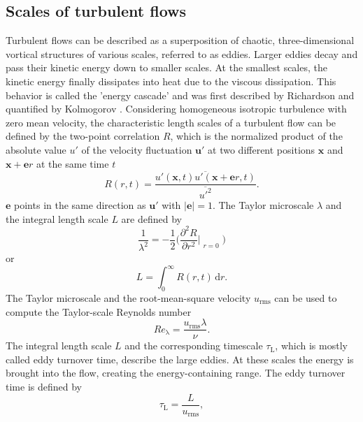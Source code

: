 \documentclass[11pt,a4paper,openany,oneside,parskip=half*]{article}
\renewcommand*\vec[1]{\boldsymbol{#1}}
\begin{document}
\subsection{Scales of turbulent flows}
Turbulent flows can be described as a superposition of chaotic, three-dimensional vortical structures of various scales, referred to as eddies. Larger eddies decay and pass their kinetic energy down to smaller scales. At the smallest scales, the kinetic energy finally dissipates into heat due to the viscous dissipation. This behavior is called the 'energy cascade' and was first described by Richardson \cite{Richardson1920} and quantified by Kolmogorov \cite{Kolmogorov1941}.
\newline
Considering homogeneous isotropic turbulence with zero mean velocity, the characteristic length scales of a turbulent flow can be defined by the two-point correlation $R$, which is the normalized product of the absolute value $u'$ of the velocity fluctuation $\vec{u}'$ at two different positions 
$\vec{x}$ and $\vec{x} + \vec{e}r$ at the same time $t$
\begin{equation}
R (r, t) = \frac{\overline{u'(\vec{x}, t)u'(\vec{x} + \vec{e}r, t)}}{\overline{u'^2}}.
\end{equation}
$\vec{e}$ points in the same direction as $\vec{u}'$ with $|\vec{e}| = 1$.
The Taylor microscale $\lambda$ and the integral length scale $L$ are defined by
\begin{equation}
 \frac{1}{\lambda^2} = -\frac{1}{2}\biggl(\frac{\partial^2 R}{\partial r^2}\Bigr|_{\substack{r=0}}\biggl)
\end{equation}
or
\begin{equation} \label{eq:integralLengthScale}
L = \int_{0}^{\infty} R (r, t)  \, \mathrm{d}r.
\end{equation}
\newline
The Taylor microscale and the root-mean-square velocity $u_{\mathrm{rms}}$ can be used to compute the Taylor-scale Reynolds number
\begin{equation}
Re_\mathrm{\lambda} = \frac{u_{\mathrm{rms}} \lambda}{\nu}.
\end{equation}
\newline
The integral length scale $L$ and the corresponding timescale $\tau_\mathrm{L}$, which is mostly called eddy turnover time, describe the large eddies. At these scales the energy is brought into the flow, creating the energy-containing range. The eddy turnover time is defined by
\begin{equation}
\tau_\mathrm{L} = \frac{L}{u_{\mathrm{rms}}},
\end{equation}
\end{document}
